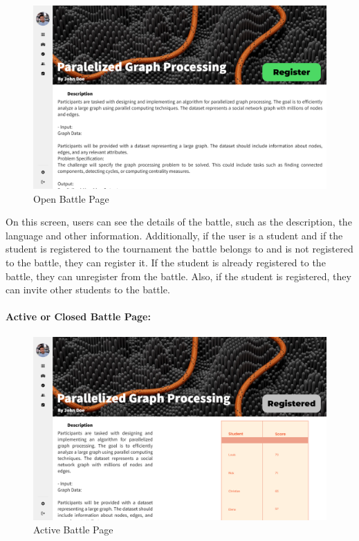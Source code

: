 \documentclass{article}
\begin{document}
\begin{figure}[H]
    \centering
    \includegraphics[width=1\textwidth]{images/UI/Battle Screen before Registration Deadline Student not registered.png}
    \caption{Open Battle Page}
    \label{fig:OpenBattlePage}
\end{figure}

On this screen, users can see the details of the battle, such as the description, the
language and other information. Additionally, if the user is a student and if the student is 
registered to the tournament the battle belongs to and is not registered to the battle, they can register it. 
If the student is already registered to the battle, they can unregister from the battle. Also, if the student
is registered, they can invite other students to the battle. 

\paragraph{Active or Closed Battle Page:}

\begin{figure}[H]
    \centering
    \includegraphics[width=1\textwidth]{images/UI/Battle Screen Active Student.png}
    \caption{Active Battle Page}
    \label{fig:ActiveBattlePage}
\end{figure}
\end{document}
